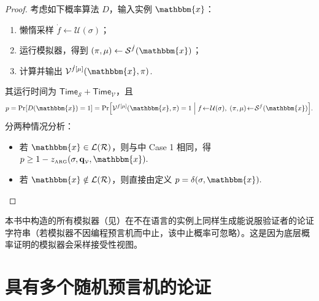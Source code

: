 \documentclass[american,singlepageview]{snargs-book-zh}
\newcommand{\Relation}{\mathcal{R}}
\newcommand{\Language}{\mathcal{L}}
\newcommand{\GetLanguage}[1]{\Language(#1)}
\newcommand{\Instance}{\mathbbm{x}}
\newcommand{\ProtoVerifier}{V}
\newcommand{\ProtoSimulator}{S}
\newcommand{\ProtoZKError}{z}
\newcommand{\ProtoTime}{\mathsf{Time}}
\newcommand{\NPDecider}{D}
\newcommand{\ARGSubscript}{\scriptscriptstyle\mathrm{ARG}}
\newcommand{\ARGFormat}[1]{\mathcal{#1}}
\newcommand{\ARGVerifier}{\ARGFormat{\ProtoVerifier}}
\newcommand{\ARGSimulator}{\ARGFormat{\ProtoSimulator}}
\newcommand{\ARGString}{\pi}
\newcommand{\ARGZKError}{\ProtoZKError_{\ARGSubscript}}
\newcommand{\ARGZKProgrammedList}{\ProgrammedList}
\newcommand{\ARGComplexityFormat}[1]{\mathbf{#1}}
\newcommand{\ARGQueryV}{\ARGComplexityFormat{q}_{\scriptscriptstyle\ARGVerifier}}
\newcommand{\ROFunction}{f}
\newcommand{\RODistribution}[1]{\mathcal{U}(#1)}
\newcommand{\ROOutputSize}{\sigma}
\newcommand{\Lazy}[1]{\dot{#1}}
\newcommand{\ROProgram}[2]{#1[#2]}
\newcommand{\ProgrammedList}{\mu}
\begin{document}
\begin{proof}
考虑如下概率算法 $\NPDecider$，输入实例 $\Instance$：
\begin{enumerate}[noitemsep]
  \item 懒惰采样 $\Lazy{\ROFunction}\gets\RODistribution{\ROOutputSize}$；
  \item 运行模拟器，得到 $(\ARGString,\ARGZKProgrammedList)\gets\ARGSimulator^{\Lazy{\ROFunction}}(\Instance)$；
  \item 计算并输出
  \(\ARGVerifier^{\ROProgram{\Lazy{\ROFunction}}{\ARGZKProgrammedList}}(\Instance,\ARGString)\).
\end{enumerate}
其运行时间为 $\ProtoTime_{\ARGSimulator}+\ProtoTime_{\ARGVerifier}$，且
\[
  p
  =\Pr[\NPDecider(\Instance)=1]
  =
  \Pr\Bigl[
    \ARGVerifier^{\ROProgram{\ROFunction}{\ARGZKProgrammedList}}(\Instance,\ARGString)=1
    \;\Big|\;
    \ROFunction\!\gets\!\RODistribution{\ROOutputSize},\;
    (\ARGString,\ARGZKProgrammedList)\!\gets\!\ARGSimulator^{\ROFunction}(\Instance)
  \Bigr].
\]
分两种情况分析：
\begin{itemize}
  \item 若 $\Instance\in\GetLanguage{\Relation}$，则与中 Case 1 相同，得
  \(
    p \ge 1-\ARGZKError(\ROOutputSize,\ARGQueryV,\Instance).
  \)

  \item 若 $\Instance\notin\GetLanguage{\Relation}$，则直接由定义
  \(
    p = \delta(\ROOutputSize,\Instance).
  \)
\end{itemize}
\end{proof}

\begin{remark}
\label{remark:constructed-simulators-output-convincing-arguments}
本书中构造的所有模拟器（见）在不在语言的实例上同样生成能说服验证者的论证字符串（若模拟器不因编程预言机而中止，该中止概率可忽略）。这是因为底层概率证明的模拟器会采样接受性视图。
\end{remark}


\chapter{具有多个随机预言机的论证}
\label{chapter:multiple-oracles-reduction}
\end{document}
